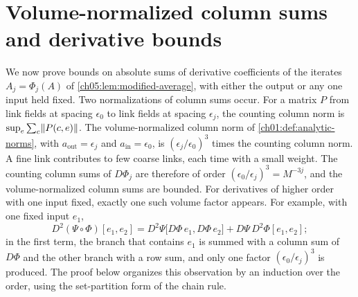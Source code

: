 \section{Volume-normalized column sums and derivative bounds}\label{ch05:sec:columns}

We now prove bounds on absolute sums of derivative coefficients of the iterates $A_j=\Phi_j(A)$ of \cref{ch05:lem:modified-average}, with either the output or any one input held fixed. Two normalizations of column sums occur. For a matrix $P$ from link fields at spacing $\epsilon_0$ to link fields at spacing $\epsilon_j$, the counting column norm is $\sup_e\sum_c\lVert P(c,e)\rVert$. The volume-normalized column norm of \cref{ch01:def:analytic-norms}, with $a_{\mathrm{out}}=\epsilon_j$ and $a_{\mathrm{in}}=\epsilon_0$, is $(\epsilon_j/\epsilon_0)^3$ times the counting column norm. A fine link contributes to few coarse links, each time with a small weight. The counting column sums of $D\Phi_j$ are therefore of order $(\epsilon_0/\epsilon_j)^3=M^{-3j}$, and the volume-normalized column sums are bounded. For derivatives of higher order with one input fixed, exactly one such volume factor appears. For example, with one fixed input $e_1$,
\[
 D^2(\Psi\circ\Phi)[e_1,e_2]=D^2\Psi\bigl[D\Phi\,e_1,D\Phi\,e_2\bigr]+D\Psi\,D^2\Phi[e_1,e_2];
\]
in the first term, the branch that contains $e_1$ is summed with a column sum of $D\Phi$ and the other branch with a row sum, and only one factor $(\epsilon_0/\epsilon_j)^3$ is produced. The proof below organizes this observation by an induction over the order, using the set-partition form of the chain rule.

